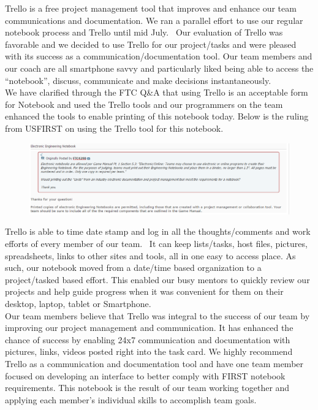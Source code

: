 Trello is a free project management tool that improves and enhance our team communications and documentation. We ran a parallel effort to use our regular notebook process and Trello until mid July.  Our evaluation of Trello was favorable and we decided to use Trello for our project/tasks and were pleased with its success as a communication/documentation tool.  Our team members and our coach are all smartphone savvy and particularly liked being able to access the “notebook”, discuss, communicate and make decisions instantaneously.\\

We have clarified through the FTC Q\&A that using Trello is an acceptable form for Notebook and used the Trello tools and our programmers on the team enhanced the tools to enable printing of this notebook today.  Below is the ruling from USFIRST on using the Trello tool for this notebook.\\

\begin{figure}[H]
	\centering
	\includegraphics[width=\linewidth]{ruling}
	\label{fig:ruling}
\end{figure}

Trello is able to time date stamp and log in all the thoughts/comments and work efforts of every member of our team.  It can keep lists/tasks, host files, pictures, spreadsheets, links to other sites and tools, all in one easy to access place.  As such, our notebook moved from a date/time based organization to a project/tasked based effort.  This enabled our busy mentors to quickly review our projects and help guide progress when it was convenient for them on their desktop, laptop, tablet or Smartphone.\\

Our team members believe that Trello was integral to the success of our team by improving our project management and communication.  It has enhanced the chance of success by enabling 24x7 communication and documentation with pictures, links, videos posted right into the task card. We highly recommend Trello as a communication and documentation tool and have one team member focused on developing an interface to better comply with FIRST notebook requirements.  This notebook is the result of our team working together and applying each member's individual skills to accomplish team goals.\\

